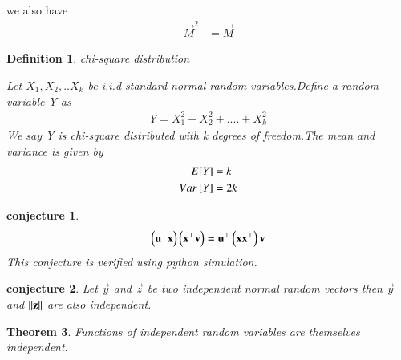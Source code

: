 \documentclass[journal,12pt,twocolumn]{IEEEtran}
\newtheorem{theorem}{Theorem}[section]
\newtheorem{conjecture}[theorem]{conjecture}
\newtheorem{definition}{Definition}[section]
\begin{document}
we also have 
\begin{align}
    \vec{M}^2&=\vec{M}
\end{align}
\begin{definition}{chi-square distribution}

 Let $X_1,X_2,..X_k$ be i.i.d  standard normal random variables.Define a random variable Y as
 \begin{align}
     Y=X_1^2+X_2^2+....+X_k^2
 \end{align}
 We say Y is chi-square distributed with k degrees of freedom.The mean and variance is given by
 \begin{align}
   E[ Y ]&=k\\
   Var{}\left[Y\right]&=2k
 \end{align}
 
\end{definition}
\begin{conjecture}
\label{l2.1}
\begin{align}
   \left(\mathbf{u}^{\top}\mathbf{x}\right)\left(\mathbf{x}^{\top}\mathbf{v}\right)=\mathbf{u}^{\top}\left(\mathbf{x}\mathbf{x}^{\top}\right)\mathbf{v}
\end{align}
This conjecture is verified using python simulation.
\end{conjecture}
\begin{conjecture}\label{2.2}
Let $\vec{y}$ and $\vec{z}$ be two independent normal random vectors then $\vec{y}$ and $\mathbf{\lVert z\rVert}$ are also independent.
\end{conjecture}
\begin{theorem}
Functions of independent random variables are themselves independent.
\end{theorem}
\end{document}
